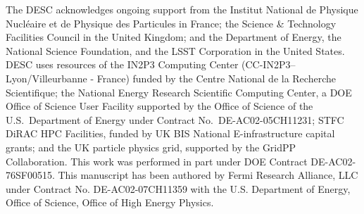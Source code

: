 %
The DESC acknowledges ongoing support from the Institut National de Physique Nucl\'eaire et de Physique des Particules in France; the Science \& Technology Facilities Council in the United Kingdom; and the Department of Energy, the National Science Foundation, and the LSST Corporation in the United States.  DESC uses resources of the IN2P3 Computing Center (CC-IN2P3--Lyon/Villeurbanne - France) funded by the Centre National de la Recherche Scientifique; the National Energy Research Scientific Computing Center, a DOE Office of Science User Facility supported by the Office of Science of the U.S.\ Department of Energy under Contract No.\ DE-AC02-05CH11231; STFC DiRAC HPC Facilities, funded by UK BIS National E-infrastructure capital grants; and the UK particle physics grid, supported by the GridPP Collaboration.  This work was performed in part under DOE Contract DE-AC02-76SF00515.
This manuscript has been authored by Fermi Research Alliance, LLC under Contract No. DE-AC02-07CH11359 with the U.S. Department of Energy, Office of Science, Office of High Energy Physics.

% 
